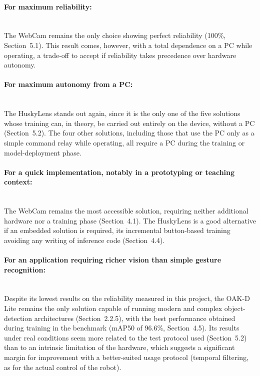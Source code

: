 \documentclass[12pt,a4paper]{report}
\begin{document}
	\paragraph{For maximum reliability:} \mbox{} \\ 
	The WebCam remains the only choice showing perfect reliability (100\%, Section~5.1). This result comes, however, with a total dependence on a PC while operating, a trade-off to accept if reliability takes precedence over hardware autonomy.
	
	\paragraph{For maximum autonomy from a PC:} \mbox{} \\ 
	The HuskyLens stands out again, since it is the only one of the five solutions whose training can, in theory, be carried out entirely on the device, without a PC (Section~5.2). The four other solutions, including those that use the PC only as a simple command relay while operating, all require a PC during the training or model-deployment phase.
	
	\paragraph{For a quick implementation, notably in a prototyping or teaching context:} \mbox{} \\ 
	The WebCam remains the most accessible solution, requiring neither additional hardware nor a training phase (Section~4.1). The HuskyLens is a good alternative if an embedded solution is required, its incremental button-based training avoiding any writing of inference code (Section~4.4).
	
	\paragraph{For an application requiring richer vision than simple gesture recognition:} \mbox{} \\ 
	Despite its lowest results on the reliability measured in this project, the OAK-D Lite remains the only solution capable of running modern and complex object-detection architectures (Section~2.2.5), with the best performance obtained during training in the benchmark (mAP50 of 96.6\%, Section~4.5). Its results under real conditions seem more related to the test protocol used (Section~5.2) than to an intrinsic limitation of the hardware, which suggests a significant margin for improvement with a better-suited usage protocol (temporal filtering, as for the actual control of the robot).
	
\end{document}
